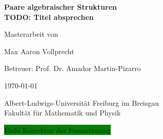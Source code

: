 \documentclass[a4paper, 11pt]{report}
\theoremstyle{definition}
\begin{document}
	\begin{titlepage}

		\centering

		$ $\par

		\vspace{4.5cm}

		\Huge{\textbf{Paare algebraischer Strukturen\\TODO: Titel absprechen}\par}

		\vspace{3cm}

		\large{Masterarbeit von \par}

		\vspace{0.4cm}

		\Large{Max Aaron Vollprecht\par}

		\vspace{0.6cm}

		\large{Betreuer: Prof. Dr. Amador Martin-Pizarro\par}

		\vfill

		\large{\today\par}

		\vspace{0.6cm}

		Albert-Ludwigs-Universität Freiburg im Breisgau\\

		Fakultät für Mathematik und Physik

	\end{titlepage}
\colorbox{green}{Ende Korrektur der Formatierung}
	
	\tableofcontents
	\newpage
	
	
    
    \newpage
    \appendix
    
    \newpage
    {}
    
    \newpage
    
\end{document}
